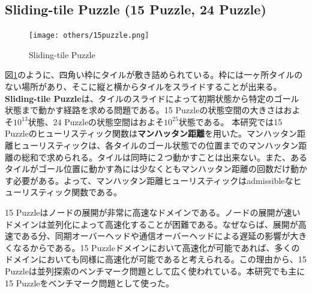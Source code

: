 \documentclass[uplatex]{jsarticle}
\begin{document}
\subsection{Sliding-tile Puzzle (15 Puzzle, 24 Puzzle)}

\begin{figure}
	\centering
	\texttt{[image: others/15puzzle.png]}
	\caption{Sliding-tile Puzzle}
	\label{fig:15puzzle}
\end{figure}%
図\ref{fig:15puzzle}のように、四角い枠にタイルが敷き詰められている。枠には一ヶ所タイルのない場所があり、そこに縦と横からタイルをスライドすることが出来る。\textbf{Sliding-tile Puzzle}は、タイルのスライドによって初期状態から特定のゴール状態まで動かす経路を求める問題である。15 Puzzleの状態空間の大きさはおよそ$10^{13}$状態、24 Puzzleの状態空間はおよそ$10^{25}$状態である。 本研究では15 Puzzleのヒューリスティック関数は\textbf{マンハッタン距離}を用いた。マンハッタン距離ヒューリスティックは、各タイルのゴール状態での位置までのマンハッタン距離の総和で求められる。タイルは同時に２つ動かすことは出来ない。また、あるタイルがゴール位置に動かす為には少なくともマンハッタン距離の回数だけ動かす必要がある。よって、マンハッタン距離ヒューリスティックはadmissibleなヒューリスティック関数である。
\newline

15 Puzzleはノードの展開が非常に高速なドメインである。ノードの展開が速いドメインは並列化によって高速化することが困難である。なぜならば、展開が高速である分、同期オーバーヘッドや通信オーバーヘッドによる遅延の影響が大きくなるからである。15 Puzzleドメインにおいて高速化が可能であれば、多くのドメインにおいても同様に高速化が可能であると考えられる。この理由から、15 Puzzleは並列探索のベンチマーク問題として広く使われている。本研究でも主に15 Puzzleをベンチマーク問題として使った。
\newline
\end{document}
